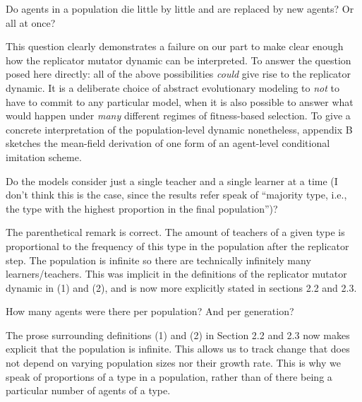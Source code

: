 \documentclass[12pt,a4paper]{article}
\begin{document}
\vspace{.5cm}
\begin{mdframed}[backgroundcolor=gray!25,linecolor=gray!25]
Do agents in a population die little by little and are replaced by new agents? Or all at once?
\end{mdframed}
This question clearly demonstrates a failure on our part to make clear enough how the
replicator mutator dynamic can be interpreted. To answer the question posed here directly: all
of the above possibilities \emph{could} give rise to the replicator dynamic. It is a deliberate
choice of abstract evolutionary modeling to \emph{not} to have to commit to any particular
model, when it is also possible to answer what would happen under \emph{many} different regimes
of fitness-based selection. To give a concrete interpretation of the population-level dynamic
nonetheless, appendix B sketches the mean-field derivation of one form of an agent-level
conditional imitation scheme.

\vspace{.5cm}
\begin{mdframed}[backgroundcolor=gray!25,linecolor=gray!25]
Do the models consider just a single teacher and a single learner at a time (I don't think this is the case, since the results refer speak of ``majority type, i.e., the type with the highest proportion in the final population'')?
\end{mdframed}
The parenthetical remark is correct. The amount of teachers of a given type is proportional to
the frequency of this type in the population after the replicator step. The population is
infinite so there are technically infinitely many learners/teachers. This was implicit in the
definitions of the replicator mutator dynamic in (1) and (2), and is now more explicitly stated
in sections 2.2 and 2.3.

\vspace{.5cm}
\begin{mdframed}[backgroundcolor=gray!25,linecolor=gray!25]
 How many agents were there per population? And per generation?
\end{mdframed}
The prose surrounding definitions (1) and (2) in Section 2.2 and 2.3 now makes explicit that
the population is infinite. This allows us to track change that does not depend on varying
population sizes nor their growth rate. This is why we speak of proportions of a type in a
population, rather than of there being a particular number of agents of a type.
\end{document}
